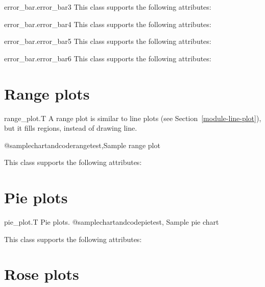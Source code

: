 \documentclass{howto}
\newcommand{\pxref}[1]{see Section~\ref{#1}}
\begin{document}
\begin{classdesc*}{error_bar.error_bar3}
This class supports the following attributes:
\end{classdesc*}

\begin{classdesc*}{error_bar.error_bar4}
This class supports the following attributes:
\end{classdesc*}

\begin{classdesc*}{error_bar.error_bar5}
This class supports the following attributes:
\end{classdesc*}

\begin{classdesc*}{error_bar.error_bar6}
This class supports the following attributes:
\end{classdesc*}

\section{Range plots}

\begin{classdesc*}{range_plot.T}
A range plot is similar to line plots (\pxref{module-line-plot}), but
it fills regions, instead of drawing line.

@samplechartandcode{rangetest,Sample range plot}
\end{classdesc*}

This class supports the following attributes:



\section{Pie plots}

\begin{classdesc*}{pie_plot.T}
Pie plots.
@samplechartandcode{pietest, Sample pie chart}
\end{classdesc*}

This class supports the following attributes:



\section{Rose plots}
\end{document}
